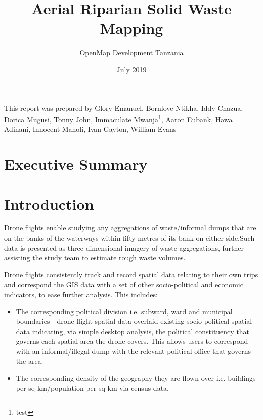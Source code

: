 \documentclass[a4paper,12pt,twoside]{article}
\title{Aerial Riparian Solid Waste Mapping}
\author{OpenMap Development Tanzania}
\date{July 2019}
\begin{document}
\maketitle

This report was prepared by Glory Emanuel, Bornlove Ntikha, Iddy Chazua, Dorica Mugusi, Tonny John, Immaculate Mwanja\footnote{test}, Aaron Eubank, Hawa Adinani, Innocent Maholi, Ivan Gayton, William Evans


\newpage
\tableofcontents

\newpage
\section{Executive Summary}
\begin{multicols}{3}

\lipsum[0-3]

\end{multicols}

\section{Introduction}

\lipsum[0-4]
  
Drone flights enable studying any aggregations of waste/informal dumps that are on the banks of the waterways within fifty metres of its bank on either side.Such data is presented as three-dimensional imagery of waste aggregations, further assisting the study team to estimate rough waste volumes.

Drone flights consistently track and record spatial data relating to their own trips and correspond the GIS data with a set of other socio-political and economic indicators, to ease further analysis. This includes:   

\begin{itemize}
    \item The corresponding political division i.e. subward, ward and municipal boundaries—drone flight spatial data overlaid existing socio-political spatial data indicating, via simple desktop analysis, the political constituency that governs each spatial area the drone covers. This allows users to correspond with an informal/illegal dump with the relevant political office that governs the area.
    \item The corresponding density of the geography they are flown over i.e. buildings per sq km/population per sq km via census data. 
\end{itemize}
\end{document}
